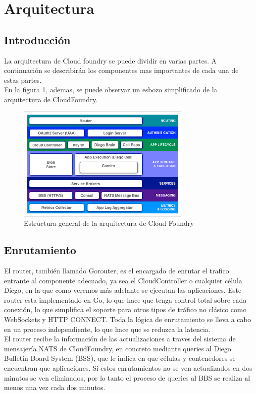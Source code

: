 \documentclass[a4paper,11pt]{article}
\begin{document}
\section{Arquitectura}
\subsection{Introducción}
\label{sec:arquitectura}
La arquitectura de Cloud foundry se puede dividir en varias partes. A continuación se describirán los componentes mas importantes de cada una de estas partes.\\
En la figura \ref{fig:cuadroArquitectura}, ademas, se puede observar un esbozo simplificado de la arquitectura de CloudFoundry.

\begin{figure}[h]
    \centering
    \includegraphics[width=0.75\textwidth]{cf_architecture_block}
    \caption{Estructura general de la arquitectura de Cloud Foundry}
    \label{fig:cuadroArquitectura}
\end{figure}

\subsection{Enrutamiento}
El router, también llamado Gorouter, es el encargado de enrutar el trafico entrante al componente adecuado, ya sea el CloudController o cualquier célula Diego, en la que como veremos más adelante se ejecutan las aplicaciones. Este router esta implementado en Go, lo que hace que tenga control total sobre cada conexión, lo que simplifica el soporte para otros tipos de tráfico no clásico como WebSockets y HTTP CONNECT.
Toda la lógica de enrutamiento se lleva a cabo en un proceso independiente, lo que hace que se reduzca la latencia.\\
El router recibe la información de las actualizaciones a traves del sistema de mensajería NATS de CloudFoundry, en concreto mediante queries al Diego Bulletin Board System (BSS), que le indica en que células y contenedores se encuentran que aplicaciones. Si estos enrutamientos no se ven actualizados en dos minutos se ven eliminados, por lo tanto el proceso de queries al BBS se realiza al menos una vez cada dos minutos.
\end{document}
